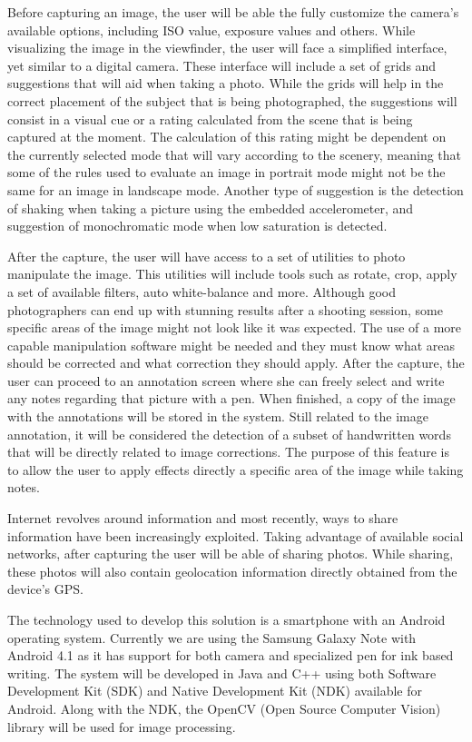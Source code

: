 Before capturing an image, the user will be able the fully customize the camera's available options, including ISO value, exposure values and others. While visualizing the image in the viewfinder, the user will face a simplified interface, yet similar to a digital camera. 
These interface will include a set of grids and suggestions that will aid when taking a photo. While the grids will help in the correct placement of the subject that is being photographed, the suggestions will consist in a visual cue or a rating calculated from the scene that is being captured at the moment. 
The calculation of this rating might be dependent on the currently selected mode that will vary according to the scenery, meaning that some of the rules used to evaluate an image in portrait mode might not be the same for an image in landscape mode. Another type of suggestion is the detection of shaking when taking a picture using the embedded accelerometer, and suggestion of monochromatic mode when low saturation is detected.

After the capture, the user will have access to a set of utilities to photo manipulate the image. This utilities will include tools such as rotate, crop, apply a set of available filters, auto white-balance and  more.
Although good photographers can end up with stunning results after a shooting session, some specific areas of the image might not look like it was expected. The use of a more capable manipulation software might be needed and they must know what areas should be corrected and what correction they should apply. After the capture, the user can proceed to an annotation screen where she can freely select and write any notes regarding that picture with a pen. When finished, a copy of the image with the annotations will be stored in the system. Still related to the image annotation, it will be considered the detection of a subset of handwritten words that will be directly related to image corrections. The purpose of this feature is to allow the user to apply effects directly a specific area of the image while taking notes.

Internet revolves around information and most recently, ways to share information have been increasingly exploited. Taking advantage of available social networks, after capturing the user will be able of sharing photos. While sharing, these photos will also contain geolocation information directly obtained from the device's GPS.

The technology used to develop this solution is a smartphone with an Android operating system. Currently we are using the Samsung Galaxy Note with Android 4.1 as it has support for both camera and specialized pen for ink based writing. The system will be developed in Java and C++ using both Software Development Kit (SDK) \cite{SDK} and Native Development Kit (NDK) \cite{NDK} available for Android.  Along with the NDK, the OpenCV (Open Source Computer Vision) \cite{OCV} library will be used for image processing.

